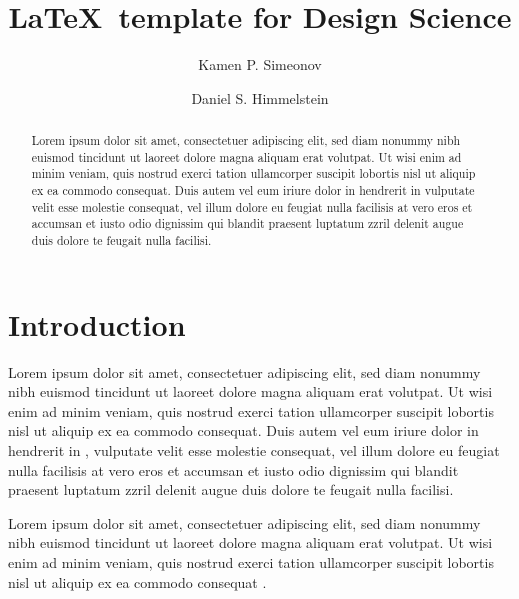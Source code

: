 \documentclass{dsj}
\begin{document}

\title{\LaTeX\ template for Design Science}

\author[1,3]{Kamen P. Simeonov}
\author[2,3]{Daniel S. Himmelstein}

\address[1]{Perelman School of Medicine, University of Pennsylvania, Philadelphia, PA, USA}
\address[2]{Biological \& Medical Informatics, University of California, San Francisco, CA, USA}
\address[3]{Department of Mechanical Science and Engineering, Graduate School of Engineering, 
  Nagoya University}

\maketitle

\begin{abstract}
Lorem ipsum dolor sit amet, consectetuer adipiscing elit, sed diam nonummy nibh euismod tincidunt ut laoreet dolore magna aliquam erat volutpat. Ut wisi enim ad minim veniam, quis nostrud exerci tation ullamcorper suscipit lobortis nisl ut aliquip ex ea commodo consequat. Duis autem vel eum iriure dolor in hendrerit in vulputate velit esse molestie consequat, vel illum dolore eu feugiat nulla facilisis at vero eros et accumsan et iusto odio dignissim qui blandit praesent luptatum zzril delenit augue duis dolore te feugait nulla facilisi.

\end{abstract}

\section{Introduction}
Lorem ipsum dolor sit amet, consectetuer adipiscing elit, sed diam nonummy nibh euismod tincidunt ut laoreet dolore magna aliquam erat volutpat. Ut wisi enim ad minim veniam, quis nostrud exerci tation ullamcorper suscipit lobortis nisl ut aliquip ex ea commodo consequat. Duis autem vel eum iriure dolor in hendrerit in \citet{bib1}, \citet{bib2} vulputate velit esse molestie consequat, vel illum dolore eu feugiat nulla facilisis at vero eros et accumsan et iusto odio dignissim qui blandit praesent luptatum zzril delenit augue duis dolore te feugait nulla facilisi.

Lorem ipsum dolor sit amet, consectetuer adipiscing elit, sed diam nonummy nibh euismod tincidunt ut laoreet dolore magna aliquam erat volutpat. Ut wisi enim ad minim veniam, quis nostrud exerci tation ullamcorper suscipit lobortis nisl ut aliquip ex ea commodo consequat \citep{bib3}.
\end{document}
